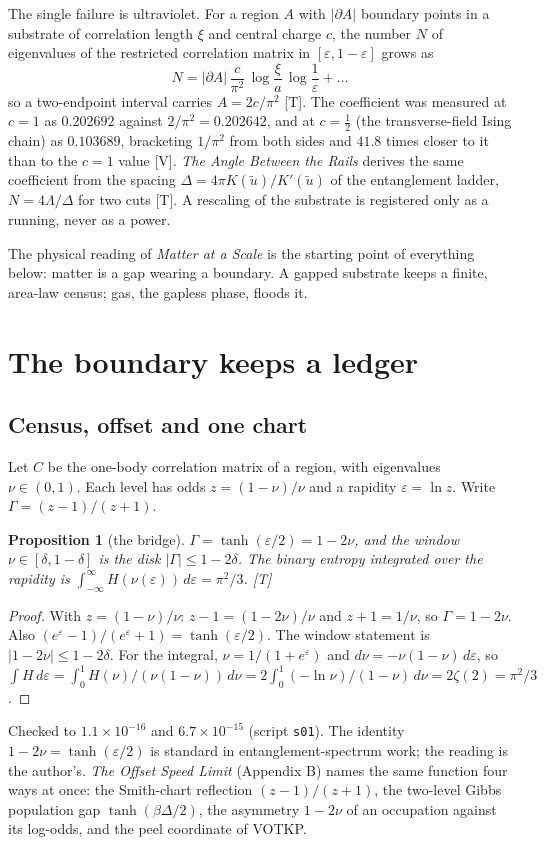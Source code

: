 \documentclass[11pt]{article}
\newtheorem{proposition}[theorem]{Proposition}
\theoremstyle{definition}
\newcommand{\grade}[1]{\textsf{\small[#1]}}
\begin{document}
The single failure is ultraviolet. For a region $A$ with $|\partial A|$ boundary points in a substrate of correlation length $\xi$ and central charge $c$, the number $N$ of eigenvalues of the restricted correlation matrix in $[\varepsilon,1-\varepsilon]$ grows as
\begin{equation}
N=|\partial A|\,\frac{c}{\pi^2}\,\log\frac{\xi}{a}\,\log\frac1\varepsilon+\dots
\label{eq:census}
\end{equation}
so a two-endpoint interval carries $A=2c/\pi^2$ \grade{T}. The coefficient was measured at $c=1$ as $0.202692$ against $2/\pi^2=0.202642$, and at $c=\tfrac12$ (the transverse-field Ising chain) as $0.103689$, bracketing $1/\pi^2$ from both sides and $41.8$ times closer to it than to the $c=1$ value \grade{V}. \emph{The Angle Between the Rails} derives the same coefficient from the spacing $\Delta=4\pi K(\tilde u)/K'(\tilde u)$ of the entanglement ladder, $N=4\Lambda/\Delta$ for two cuts \grade{T}. A rescaling of the substrate is registered only as a running, never as a power.

The physical reading of \emph{Matter at a Scale} is the starting point of everything below: matter is a gap wearing a boundary. A gapped substrate keeps a finite, area-law census; gas, the gapless phase, floods it.

\section{The boundary keeps a ledger}
\subsection{Census, offset and one chart}
Let $C$ be the one-body correlation matrix of a region, with eigenvalues $\nu\in(0,1)$. Each level has odds $z=(1-\nu)/\nu$ and a rapidity $\varepsilon=\ln z$. Write $\Gamma=(z-1)/(z+1)$.

\begin{proposition}[the bridge] \label{prop:bridge}
$\Gamma=\tanh(\varepsilon/2)=1-2\nu$, and the window $\nu\in[\delta,1-\delta]$ is the disk $|\Gamma|\le1-2\delta$. The binary entropy integrated over the rapidity is $\int_{-\infty}^{\infty}H(\nu(\varepsilon))\,d\varepsilon=\pi^2/3$. \grade{T}
\end{proposition}
\begin{proof}
With $z=(1-\nu)/\nu$: $z-1=(1-2\nu)/\nu$ and $z+1=1/\nu$, so $\Gamma=1-2\nu$. Also $(e^\varepsilon-1)/(e^\varepsilon+1)=\tanh(\varepsilon/2)$. The window statement is $|1-2\nu|\le1-2\delta$. For the integral, $\nu=1/(1+e^\varepsilon)$ and $d\nu=-\nu(1-\nu)\,d\varepsilon$, so $\int H\,d\varepsilon=\int_0^1 H(\nu)/(\nu(1-\nu))\,d\nu=2\int_0^1(-\ln\nu)/(1-\nu)\,d\nu=2\zeta(2)=\pi^2/3$.
\end{proof}
Checked to $1.1\times10^{-16}$ and $6.7\times10^{-15}$ (script \texttt{s01}). The identity $1-2\nu=\tanh(\varepsilon/2)$ is standard in entanglement-spectrum work; the reading is the author's. \emph{The Offset Speed Limit} (Appendix B) names the same function four ways at once: the Smith-chart reflection $(z-1)/(z+1)$, the two-level Gibbs population gap $\tanh(\beta\Delta/2)$, the asymmetry $1-2\nu$ of an occupation against its log-odds, and the peel coordinate of VOTKP.
\end{document}

